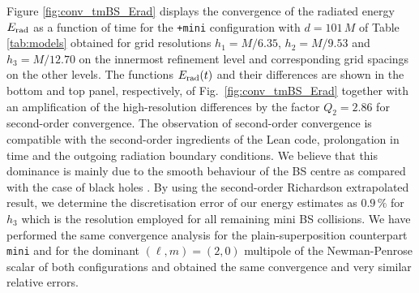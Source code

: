 \documentclass[11pt]{report}  %
\begin{document}
Figure \ref{fig:conv_tmBS_Erad} displays the convergence
of the radiated energy $E_{\rm rad}$ as a function
of time for the {\tt +mini} configuration with $d=101\,M$ of
Table \ref{tab:models} obtained for grid resolutions
$h_1=M/6.35$, $h_2=M/9.53$ and $h_3=M/12.70$ on the
innermost refinement level and corresponding grid 
spacings on the other levels. The functions
$E_{\rm rad}(t)$ and their differences are shown in the
bottom and top panel, respectively, of Fig.~\ref{fig:conv_tmBS_Erad}
together with an amplification of the high-resolution
differences by the factor $Q_2=2.86$ for second-order
convergence. The observation of second-order convergence
is compatible with the second-order ingredients of the
{\sc Lean} code, prolongation in time and the outgoing
radiation boundary conditions. We believe that this
dominance is mainly due to the smooth behaviour
of the BS centre as compared with the case of black holes
\cite{Husa:2007hp}. By using the second-order
Richardson extrapolated result, we determine the
discretisation error of our energy estimates as
$0.9\,\%$ for $h_3$ which is the resolution employed
for all remaining mini BS collisions. We have performed
the same convergence analysis for the plain-superposition
counterpart {\tt mini} and for the dominant $(\ell,m)=(2,0)$
multipole of the Newman-Penrose scalar of both configurations
and obtained the same convergence and very similar relative
errors.
%
%
\end{document}
